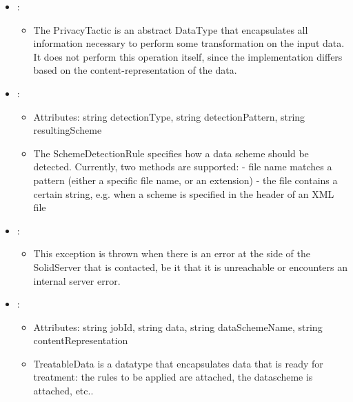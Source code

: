 \begin{itemize}[nolistsep,noitemsep]
\item {}: 
\begin{itemize}[noitemsep,nolistsep]

\item[] The PrivacyTactic is an abstract DataType that encapsulates all information necessary to perform some transformation on the input data. It does not perform this operation itself, since the implementation differs based on the content-representation of the data.
\end{itemize}

\item {}: 
\begin{itemize}[noitemsep,nolistsep]
\item[] Attributes: string detectionType, string detectionPattern, string resultingScheme
\item[] The SchemeDetectionRule specifies how a data scheme should be detected. Currently, two methods are supported:
- file name matches a pattern (either a specific file name, or an extension)
- the file contains a certain string, e.g. when a scheme is specified in the header of an XML file
\end{itemize}

\item {}: 
\begin{itemize}[noitemsep,nolistsep]

\item[] This exception is thrown when there is an error at the side of the SolidServer that is contacted, be it that it is unreachable or encounters an internal server error.
\end{itemize}

\item {}: 
\begin{itemize}[noitemsep,nolistsep]
\item[] Attributes: string jobId, string data, string dataSchemeName, string contentRepresentation
\item[] TreatableData is a datatype that encapsulates data that is ready for treatment: the rules to be applied are attached, the datascheme is attached, etc..
\end{itemize}

\end{itemize}


